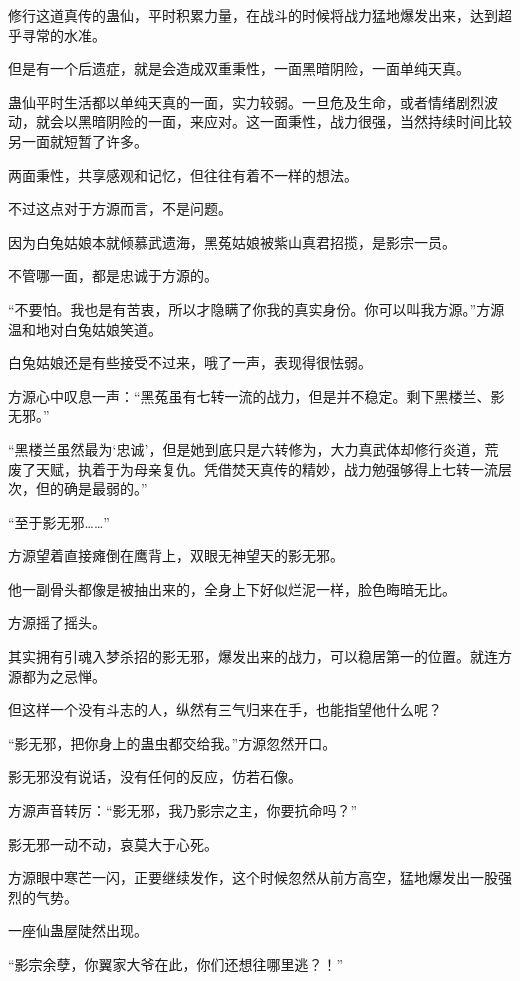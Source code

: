 \begin{this_body}
修行这道真传的蛊仙，平时积累力量，在战斗的时候将战力猛地爆发出来，达到超乎寻常的水准。

但是有一个后遗症，就是会造成双重秉性，一面黑暗阴险，一面单纯天真。

蛊仙平时生活都以单纯天真的一面，实力较弱。一旦危及生命，或者情绪剧烈波动，就会以黑暗阴险的一面，来应对。这一面秉性，战力很强，当然持续时间比较另一面就短暂了许多。

两面秉性，共享感观和记忆，但往往有着不一样的想法。

不过这点对于方源而言，不是问题。

因为白兔姑娘本就倾慕武遗海，黑菟姑娘被紫山真君招揽，是影宗一员。

不管哪一面，都是忠诚于方源的。

“不要怕。我也是有苦衷，所以才隐瞒了你我的真实身份。你可以叫我方源。”方源温和地对白兔姑娘笑道。

白兔姑娘还是有些接受不过来，哦了一声，表现得很怯弱。

方源心中叹息一声：“黑菟虽有七转一流的战力，但是并不稳定。剩下黑楼兰、影无邪。”

“黑楼兰虽然最为‘忠诚’，但是她到底只是六转修为，大力真武体却修行炎道，荒废了天赋，执着于为母亲复仇。凭借焚天真传的精妙，战力勉强够得上七转一流层次，但的确是最弱的。”

“至于影无邪……”

方源望着直接瘫倒在鹰背上，双眼无神望天的影无邪。

他一副骨头都像是被抽出来的，全身上下好似烂泥一样，脸色晦暗无比。

方源摇了摇头。

其实拥有引魂入梦杀招的影无邪，爆发出来的战力，可以稳居第一的位置。就连方源都为之忌惮。

但这样一个没有斗志的人，纵然有三气归来在手，也能指望他什么呢？

“影无邪，把你身上的蛊虫都交给我。”方源忽然开口。

影无邪没有说话，没有任何的反应，仿若石像。

方源声音转厉：“影无邪，我乃影宗之主，你要抗命吗？”

影无邪一动不动，哀莫大于心死。

方源眼中寒芒一闪，正要继续发作，这个时候忽然从前方高空，猛地爆发出一股强烈的气势。

一座仙蛊屋陡然出现。

“影宗余孽，你翼家大爷在此，你们还想往哪里逃？！”

\end{this_body}

